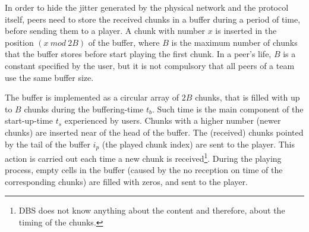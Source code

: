 

\label{sec:buffering_chunks}

In order to hide the jitter generated by the physical network and the
protocol itself, peers need to store the received chunks in a buffer
during a period of time, before sending them to a player. A chunk with
number $x$ is inserted in the position $(x~\mathit{mod}~2B)$ of the
buffer, where $B$ is the maximum number of chunks that the buffer
stores before start playing the first chunk. In a peer's life, $B$ is
a constant specified by the user, but it is not compulsory that all
peers of a team use the same buffer size.

The buffer is implemented as a circular array of $2B$ chunks, that is
filled with up to $B$ chunks during the \gls{buffering-time} $t_b$.
Such time is the main component of the \gls{start-up-time} $t_s$
experienced by users. Chunks with a higher number (newer chunks) are
inserted near of the head of the buffer. The (received) chunks pointed
by the tail of the buffer $i_p$ (the played chunk index) are sent to
the player. This action is carried out each time a new chunk is
received\footnote{DBS does not know anything about the content and
  therefore, about the timing of the chunks.}. During the playing
process, empty cells in the buffer (caused by the no reception on time
of the corresponding chunks) are filled with zeros, and sent to the
player.

